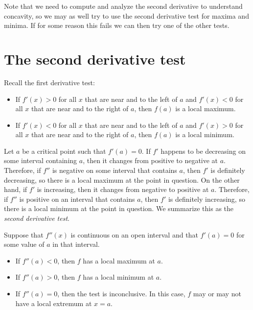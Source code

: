 \documentclass{ximera}
\begin{document}
Note that we need to compute and analyze the second derivative to
understand concavity, so we may as well try to use the second
derivative test for maxima and minima. If for some reason this fails
we can then try one of the other tests.

\section{The second derivative test}


Recall the first derivative test:

\begin{itemize}
\item If $f'(x)>0$ for all $x$ that are near and to the left of $a$ and $f'(x)<0$  for all $x$ that are near and to the right of
  $a$, then $f(a)$ is a local maximum.
\item If $f'(x)<0$ for all $x$ that are near and  to the left of $a$ and $f'(x)>0$ for all $x$ that are near and  to the right of
  $a$, then $f(a)$ is a local minimum.
\end{itemize}

Let $a$ be a critical point such that $f'(a)=0$.
If $f'$  happens to be decreasing on some interval containing $a$, then it changes from positive to negative at $a$. 
Therefore, if $f''$ is negative on some interval that contains $a$,
then $f'$ is definitely decreasing, so there is a local maximum at
the point in question. On the other hand, if $f'$ is increasing, then it changes from
negative to positive at $a$. Therefore,
if $f''$ is positive on an interval that contains $a$, then
$f'$ is definitely increasing, so there is a local minimum at the
point in question. We summarize this as the \textit{second derivative
  test}.

\begin{theorem}\label{T:sdt}
Suppose that $f''(x)$ is continuous on an open interval and that
$f'(a)=0$ for some value of $a$ in that interval.
\begin{itemize}
\item If $f''(a) <0$, then $f$ has a local maximum at $a$.
\item If $f''(a) >0$, then $f$ has a local minimum at $a$.
\item If $f''(a) =0$, then the test is inconclusive. In this case,
  $f$ may or may not have a local extremum at $x=a$.
\end{itemize}
\end{theorem}
\end{document}
